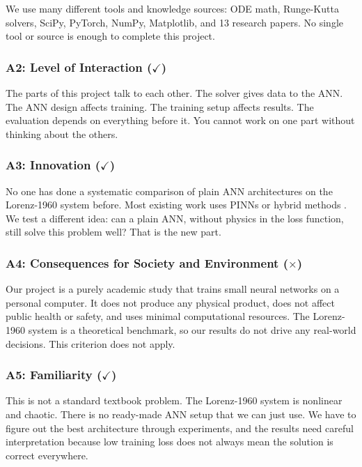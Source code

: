 We use many different tools and knowledge sources: ODE math, Runge-Kutta solvers, SciPy, PyTorch, NumPy, Matplotlib, and 13 research papers. No single tool or source is enough to complete this project.

\subsubsection{A2: Level of Interaction ($\checkmark$)}

The parts of this project talk to each other. The solver gives data to the ANN. The ANN design affects training. The training setup affects results. The evaluation depends on everything before it. You cannot work on one part without thinking about the others.

\subsubsection{A3: Innovation ($\checkmark$)}

No one has done a systematic comparison of plain ANN architectures on the Lorenz-1960 system before. Most existing work uses PINNs or hybrid methods \cite{matthews2024pinnde}. We test a different idea: can a plain ANN, without physics in the loss function, still solve this problem well? That is the new part.

\subsubsection{A4: Consequences for Society and Environment ($\times$)}

Our project is a purely academic study that trains small neural networks on a personal computer. It does not produce any physical product, does not affect public health or safety, and uses minimal computational resources. The Lorenz-1960 system is a theoretical benchmark, so our results do not drive any real-world decisions. This criterion does not apply.

\subsubsection{A5: Familiarity ($\checkmark$)}

This is not a standard textbook problem. The Lorenz-1960 system is nonlinear and chaotic. There is no ready-made ANN setup that we can just use. We have to figure out the best architecture through experiments, and the results need careful interpretation because low training loss does not always mean the solution is correct everywhere.

